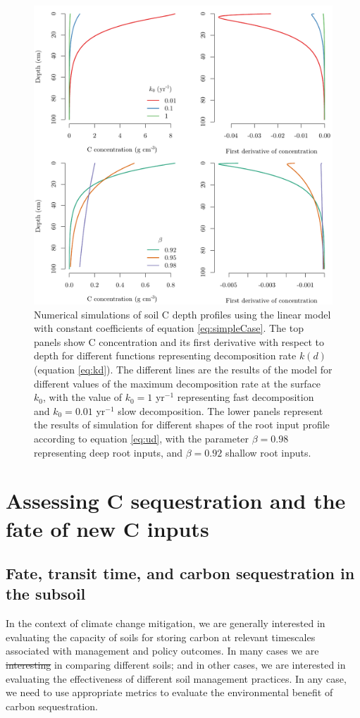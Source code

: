 \documentclass[11pt, oneside, a4paper]{article}   	%
\providecommand{\DIFaddtex}[1]{{\protect\color{blue}\uwave{#1}}} %
\providecommand{\DIFdeltex}[1]{{\protect\color{red}\sout{#1}}}                      %
\providecommand{\DIFaddbegin}{} %
\providecommand{\DIFaddend}{} %
\providecommand{\DIFdelbegin}{} %
\providecommand{\DIFdelend}{} %
\providecommand{\DIFadd}[1]{\texorpdfstring{\DIFaddtex{#1}}{#1}} %
\providecommand{\DIFdel}[1]{\texorpdfstring{\DIFdeltex{#1}}{}} %
\newcommand{\DIFscaledelfig}{0.5}
\newlength{\DIFdelgraphicswidth} %
\newlength{\DIFdelgraphicsheight} %
\newcommand{\DIFaddincludegraphics}[2][]{{\color{blue}\fbox{\DIFOincludegraphics[#1]{#2}}}} %
\newcommand{\DIFdelincludegraphics}[2][]{%
\sbox{\DIFdelgraphicsbox}{\DIFOincludegraphics[#1]{#2}}%
\settoboxwidth{\DIFdelgraphicswidth}{\DIFdelgraphicsbox} %
\settoboxtotalheight{\DIFdelgraphicsheight}{\DIFdelgraphicsbox} %
\scalebox{\DIFscaledelfig}{%
\parbox[b]{\DIFdelgraphicswidth}{\usebox{\DIFdelgraphicsbox}\\[-\baselineskip] \rule{\DIFdelgraphicswidth}{0em}}\llap{\resizebox{\DIFdelgraphicswidth}{\DIFdelgraphicsheight}{%
\setlength{\unitlength}{\DIFdelgraphicswidth}%
\begin{picture}(1,1)%
\thicklines\linethickness{2pt} %
{\color[rgb]{1,0,0}\put(0,0){\framebox(1,1){}}}%
{\color[rgb]{1,0,0}\put(0,0){\line( 1,1){1}}}%
{\color[rgb]{1,0,0}\put(0,1){\line(1,-1){1}}}%
\end{picture}%
}\hspace*{3pt}}} %
} %
\DeclareRobustCommand{\DIFaddbegin}{\DIFOaddbegin \let\includegraphics\DIFaddincludegraphics} %
\DeclareRobustCommand{\DIFaddend}{\DIFOaddend \let\includegraphics\DIFOincludegraphics} %
\DeclareRobustCommand{\DIFdelbegin}{\DIFOdelbegin \let\includegraphics\DIFdelincludegraphics} %
\DeclareRobustCommand{\DIFdelend}{\DIFOaddend \let\includegraphics\DIFOincludegraphics} %
\begin{document}
\begin{figure}[htbp]
   \centering
   \includegraphics[width=\textwidth]{Figures/rootDecomp.pdf} %
%
   \caption{Numerical simulations of soil C depth profiles using the linear model with constant coefficients of equation \ref{eq:simpleCase}. The top panels show C concentration and its first derivative with respect to depth for different functions representing decomposition rate $k(d)$ (equation \ref{eq:kd}). The different lines are the results of the model for different values of the maximum decomposition rate at the surface $k_0$, with the value of $k_0 =1$ yr$^{-1}$ representing fast decomposition and $k_0 = 0.01$ yr$^{-1}$ slow decomposition. The lower panels represent the results of simulation for different shapes of the root input profile according to equation \ref{eq:ud}, with the parameter $\beta = 0.98$ representing deep root inputs, and $\beta = 0.92$ shallow root inputs.}
   \label{fig:rootDecomp}
\end{figure}

\section{Assessing C sequestration and the fate of new C inputs}
\subsection{Fate, transit time, and carbon sequestration in the subsoil}
In the context of climate change mitigation, we are generally interested in evaluating the capacity of soils for storing carbon at relevant timescales associated with management and policy outcomes. In many cases we are \DIFdelbegin \DIFdel{interesting }\DIFdelend \DIFaddbegin \DIFadd{interested }\DIFaddend in comparing different soils; and in other cases, we are interested in evaluating the effectiveness of different soil management practices. In any case, we need to use appropriate metrics to evaluate the environmental benefit of carbon sequestration. 
\end{document}
